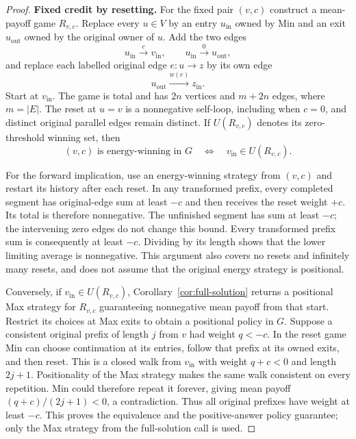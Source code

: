 \begin{proof}
\noindent\textbf{Fixed credit by resetting.}\enspace
For the fixed pair $(v,c)$ construct a mean-payoff game $R_{v,c}$.
Replace every $u\in V$ by an entry $u_{\mathrm{in}}$ owned by Min and
an exit $u_{\mathrm{out}}$ owned by the original owner of $u$. Add the
two edges
\[
 u_{\mathrm{in}}\xrightarrow{c}v_{\mathrm{in}},
 \qquad
 u_{\mathrm{in}}\xrightarrow{0}u_{\mathrm{out}},
\]
and replace each labelled original edge $e:u\to z$ by its own edge
\[
 u_{\mathrm{out}}\xrightarrow{w(e)}z_{\mathrm{in}}.
\]
Start at $v_{\mathrm{in}}$. The game is total and has $2n$ vertices
and $m+2n$ edges, where $m=|E|$. The reset at $u=v$ is a nonnegative
self-loop, including when $c=0$, and distinct original parallel edges
remain distinct. If $U(R_{v,c})$ denotes its zero-threshold winning
set, then
\begin{equation}
 (v,c)\text{ is energy-winning in }G
 \quad\Longleftrightarrow\quad v_{\mathrm{in}}\in U(R_{v,c}).
 \label{eq:energy-reset-equivalence}
\end{equation}

For the forward implication, use an energy-winning strategy from
$(v,c)$ and restart its history after each reset. In any transformed
prefix, every completed segment has original-edge sum at least $-c$
and then receives the reset weight $+c$. Its total is therefore
nonnegative. The unfinished segment has sum at least $-c$; the
intervening zero edges do not change this bound. Every transformed
prefix sum is consequently at least $-c$. Dividing by its length
shows that the lower limiting average is nonnegative. This argument
also covers no resets and infinitely many resets, and does not assume
that the original energy strategy is positional.

Conversely, if $v_{\mathrm{in}}\in U(R_{v,c})$,
Corollary~\ref{cor:full-solution} returns a positional Max strategy
for $R_{v,c}$ guaranteeing nonnegative mean payoff from that start.
Restrict its choices at Max exits to obtain a positional policy in
$G$. Suppose a consistent original prefix of length $j$ from $v$ had
weight $q<-c$. In the reset game Min can choose continuation at its
entries, follow that prefix at its owned exits, and then reset. This
is a closed walk from $v_{\mathrm{in}}$ with weight $q+c<0$ and
length $2j+1$. Positionality of the Max strategy makes the same walk
consistent on every repetition. Min could therefore repeat it forever,
giving mean payoff $(q+c)/(2j+1)<0$, a contradiction. Thus all original
prefixes have weight at least $-c$. This proves the equivalence and
the positive-answer policy guarantee; only the Max strategy from the
full-solution call is used.


\end{proof}
